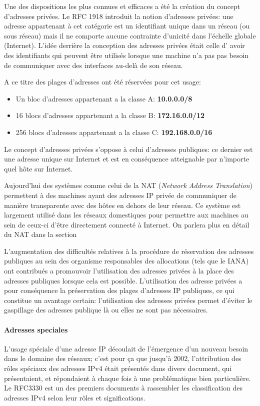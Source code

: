 Une des dispositions les plus connues et efficaces a été la création du concept
d'adresses privées. Le RFC 1918 introduit la notion d'adresses privées: une adresse
appartenant à cet catégorie est un identifiant unique dans un réseau (ou sous
réseau) mais il ne comporte aucune contrainte d'unicité dans l'échelle globale
(Internet). L'idée derrière la conception des adresses privées était celle d'
avoir des identifiants qui peuvent être utilisés lorsque une machine n'a pas
pas besoin de communiquer avec des interfaces au-delà de son réseau.

A ce titre des plages d'adresses ont été réservées pour cet usage:

\begin{itemize}
\item Un bloc d'adresses appartenant a la classe A: \textbf{10.0.0.0/8}
\item 16 blocs d'adresses appartenant a la classe B: \textbf{172.16.0.0/12}
\item 256 blocs d'adresses appartenant a la classe C: \textbf{192.168.0.0/16}
\end{itemize}

\smallbreak
Le concept d'adresses privées s'oppose à celui d'adresses publiques: ce dernier est 
une adresse unique sur Internet et est en conséquence atteignable par n'importe
quel hôte sur Internet.

Aujourd'hui des systèmes comme celui de la NAT ({\it Network Address
Translation}) permettent à des machines ayant des adresses IP privée de communiquer
de manière transparente avec des hôtes en dehors de leur réseau. Ce système est
largement utilisé dans les réseaux domestiques pour permettre aux machines au
sein de ceux-ci d'être directement connecté à Internet. On parlera plus en
détail du NAT dans la section %
\smallbreak


 
L'augmentation des difficultés relatives à la procédure de réservation des adresses
publiques au sein des organisme responsables des allocations\cite{url-RFC-1918}
(tels que le IANA) ont contribués a promouvoir l'utilisation des adresses privées à la place
 des adresses publiques lorsque cela est possible.
L'utilisation des adresse privées a pour conséquence la préservation des plages
d'adresses IP publiques, ce qui constitue un avantage certain: l'utilisation
des adresses privées permet d'éviter le gaspillage des adresses publique là ou elles
ne sont pas nécessaires.


\paragraph{Adresses speciales}
L'usage spéciale d'une adresse IP découlait de l'émergence
d'un nouveau besoin dans le domaine des réseaux; c'est pour
ça que jusqu'à 2002, l'attribution des rôles spéciaux des adresses
IPv4 était présentés dans divers document, qui présentaient, et répondaient à chaque fois à une
problématique bien particulière. Le RFC3330 est un des premiers documents à
rassembler les classification des adresses IPv4 selon leur rôles et significations.

